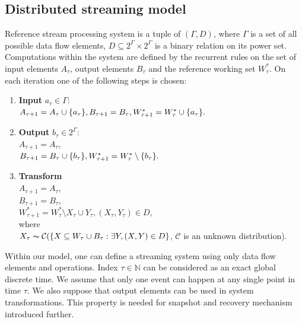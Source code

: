 \label{fs-formalism}

\subsection{Distributed streaming model}

\begin{definition}{Reference stream processing system}
\label{reference_system}
is a tuple of $(\Gamma,D)$, where $\Gamma$ is a set of all possible data flow elements, $D\subseteq{2^{\Gamma}\times2^{\Gamma}}$ is a binary relation on its power set. Computations within the system are defined by the recurrent rules on the set of input elements $A_\tau$, output elements $B_\tau$ and the reference working set $W^{*}_\tau$. On each iteration one of the following steps is chosen:

\begin{enumerate}
    \item \textbf{Input} $a_\tau\in{\Gamma}$:\\ $A_{\tau+1}=A_\tau \cup \{a_\tau\}, \\ B_{\tau+1}=B_{\tau}, \\ W^{*}_{\tau+1}=W^{*}_{\tau} \cup \{a_\tau\}.$
    \item \textbf{Output} $b_\tau\in{2^\Gamma}$:\\ $A_{\tau + 1} = A_{\tau}$, \\ $B_{\tau+1}=B_\tau \cup \{b_\tau\}, \\ W^{*}_{\tau+1}=W^{*}_{\tau} \setminus \{b_\tau\}.$
    \item \textbf{Transform}\\ $A_{\tau + 1} = A_{\tau}$,\\ $B_{\tau+1}=B_{\tau}$, \\ $W^{*}_{\tau+1}=W^{*}_\tau \setminus X_\tau \cup Y_\tau, (X_\tau,Y_\tau) \in D$, \\where\\$X_\tau \thicksim \mathcal{C}(\{X \subseteq W_\tau \cup B_\tau : \exists Y, (X,Y) \in D \}$, $\mathcal{C}$ is an unknown distribution). \label{random_formula}
\end{enumerate}

\end{definition}

Within our model, one can define a streaming system using only data flow elements and operations. Index $\tau\in{\mathbb{N}}$ can be considered as an exact global discrete time. We assume that only one event can happen at any single point in time $\tau$. We also suppose that output elements can be used in system transformations. This property is needed for snapshot and recovery mechanism introduced further. 

